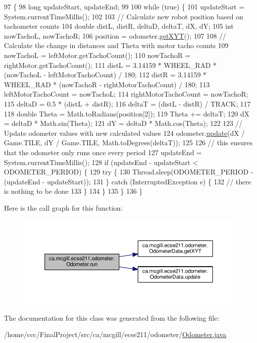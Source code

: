 \begin{DoxyCode}
97                     \{
98     \textcolor{keywordtype}{long} updateStart, updateEnd;
99 
100     \textcolor{keywordflow}{while} (\textcolor{keyword}{true}) \{
101       updateStart = System.currentTimeMillis();
102 
103       \textcolor{comment}{// Calculate new robot position based on tachometer counts}
104       \textcolor{keywordtype}{double} distL, distR, deltaD, deltaT, dX, dY;
105       \textcolor{keywordtype}{int} nowTachoL, nowTachoR;
106       position = odometer.\hyperlink{classca_1_1mcgill_1_1ecse211_1_1odometer_1_1_odometer_data_a8f40f0264c68f0cbed4fff1723ae7863}{getXYT}();
107 
108       \textcolor{comment}{// Calculate the change in distances and Theta with motor tacho counts}
109       nowTachoL = leftMotor.getTachoCount();
110       nowTachoR = rightMotor.getTachoCount();
111       distL = 3.14159 * WHEEL\_RAD * (nowTachoL - leftMotorTachoCount) / 180;
112       distR = 3.14159 * WHEEL\_RAD * (nowTachoR - rightMotorTachoCount) / 180;
113       leftMotorTachoCount = nowTachoL;
114       rightMotorTachoCount = nowTachoR;
115       deltaD = 0.5 * (distL + distR);
116       deltaT = (distL - distR) / TRACK;
117 
118       \textcolor{keywordtype}{double} Theta = Math.toRadians(position[2]);
119       Theta += deltaT;
120       dX = deltaD * Math.sin(Theta);
121       dY = deltaD * Math.cos(Theta);
122 
123       \textcolor{comment}{// Update odometer values with new calculated values}
124       odometer.\hyperlink{classca_1_1mcgill_1_1ecse211_1_1odometer_1_1_odometer_data_aaa06f190d634299fcb1b97a1891dad85}{update}(dX / Game.TILE, dY / Game.TILE, Math.toDegrees(deltaT));
125 
126       \textcolor{comment}{// this ensures that the odometer only runs once every period}
127       updateEnd = System.currentTimeMillis();
128       \textcolor{keywordflow}{if} (updateEnd - updateStart < ODOMETER\_PERIOD) \{
129         \textcolor{keywordflow}{try} \{
130           Thread.sleep(ODOMETER\_PERIOD - (updateEnd - updateStart));
131         \} \textcolor{keywordflow}{catch} (InterruptedException e) \{
132           \textcolor{comment}{// there is nothing to be done}
133         \}
134       \}
135     \}
136   \}
\end{DoxyCode}
Here is the call graph for this function\+:\nopagebreak
\begin{figure}[H]
\begin{center}
\leavevmode
\includegraphics[width=350pt]{classca_1_1mcgill_1_1ecse211_1_1odometer_1_1_odometer_af0ff4c5121973a8310cf986e25fa0d87_cgraph}
\end{center}
\end{figure}


The documentation for this class was generated from the following file\+:\begin{DoxyCompactItemize}
\item 
/home/ccc/\+Final\+Project/src/ca/mcgill/ecse211/odometer/\hyperlink{_odometer_8java}{Odometer.\+java}\end{DoxyCompactItemize}
